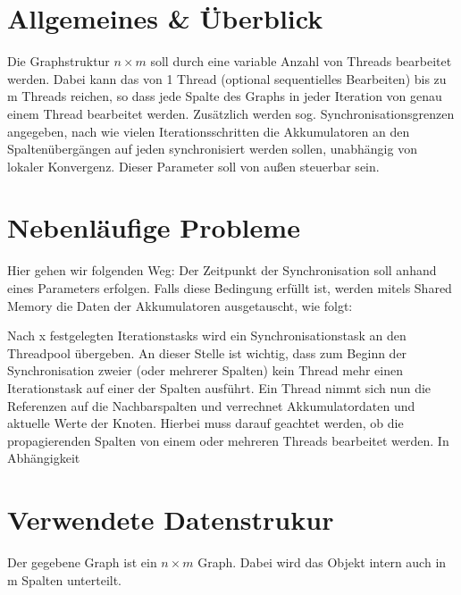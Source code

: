 
\usepackage{pdfpages}
\usepackage{listings}



\newcommand{\subttl}{\textbf{Milestone 1}}
\newcommand{\StudNameOne}{Christoph Rosenhauer (2549220)}
\newcommand{\StudNameTwo}{Lukas Schaal (2539218)}
\newcommand{\StudNameThree}{Jens Heinen (2542182)}


\section{Allgemeines \& Überblick}
Die Graphstruktur $n \times m$ soll durch eine variable Anzahl von Threads bearbeitet werden. Dabei kann das von 1 Thread (optional sequentielles Bearbeiten) bis zu m Threads reichen, so dass jede Spalte des Graphs in jeder Iteration von genau einem Thread bearbeitet werden. 
Zusätzlich werden sog. Synchronisationsgrenzen  angegeben, nach wie vielen Iterationsschritten die Akkumulatoren an den Spaltenübergängen auf jeden synchronisiert werden sollen, unabhängig von lokaler Konvergenz. Dieser Parameter soll von außen steuerbar sein. 

\section{Nebenläufige Probleme}
Hier gehen wir folgenden Weg:
Der Zeitpunkt der Synchronisation soll anhand eines Parameters erfolgen. Falls diese Bedingung erfüllt ist, werden mitels Shared Memory die Daten der Akkumulatoren ausgetauscht, wie folgt: 

Nach x festgelegten Iterationstasks wird ein Synchronisationstask an den Threadpool übergeben. An dieser Stelle ist wichtig, dass zum Beginn der Synchronisation zweier (oder mehrerer Spalten) kein Thread mehr einen Iterationstask auf einer der Spalten ausführt. Ein Thread nimmt sich nun die Referenzen auf die Nachbarspalten und verrechnet Akkumulatordaten und aktuelle Werte der Knoten. Hierbei muss darauf geachtet werden, ob die propagierenden Spalten von einem oder mehreren Threads bearbeitet werden. In Abhängigkeit 

\section{Verwendete Datenstrukur}
Der gegebene Graph ist ein $n\times m$ Graph. Dabei wird das Objekt intern auch in m Spalten unterteilt. 

